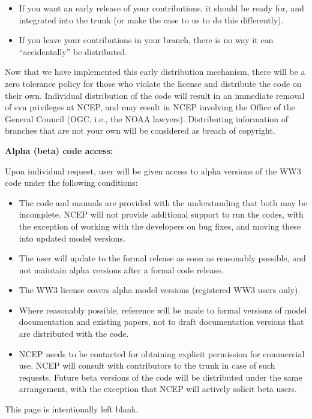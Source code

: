 \documentclass[12pt]{article}
\newcommand{\pb}{\strut \vfill \pagebreak}
\newcommand{\bpage}{\vfill \pagebreak \strut

\vspace{2.5in} \centerline{This page is intentionally left blank.}}
\newcommand{\bpagea}{\strut

\vspace{2.5in} \centerline{This page is intentionally left blank.}}
\begin{document}
\begin{itemize}
\item If you want an early release of your contributions, it should be ready
  for, and integrated into the trunk (or make the case to us to do this
  differently).
\item If you leave your contributions in your branch, there is no
  way it can ``accidentally'' be distributed.  
\end{itemize}

\noindent
Now that we have implemented this early distribution mechanism, there will be
a zero tolerance policy for those who violate the license and distribute the
code on their own. Individual distribution of the code will result in an
immediate removal of svn privileges at NCEP, and may result in NCEP involving
the Office of the General Council (OGC, i.e., the NOAA lawyers). Distributing
information of branches that are not your own will be considered as breach of
copyright.

\vspace{\baselineskip} \noindent
{\bf Alpha (beta) code access: }

\vspace{\baselineskip} \noindent 
Upon individual request, user will be given access to alpha versions of the
WW3 code under the following conditions: 

\begin{itemize}
\item The code and manuals are provided with the understanding that both may
  be incomplete. NCEP will not provide additional support to run the codes,
  with the exception of working with the developers on bug fixes, and moving
  these into updated model versions.
\item The user will update to the formal release as soon as reasonably
  possible, and not maintain alpha versions after a formal code release.
\item The WW3 license covers alpha model versions (registered WW3 users only).
\item Where reasonably possible, reference will be made to formal versions of
  model documentation and existing papers, not to draft documentation versions
  that are distributed with the code.
\item NCEP needs to be contacted for obtaining explicit permission for
  commercial use. NCEP will consult with contributors to the trunk in case of
  such requests.  Future beta versions of the code will be distributed under
  the same arrangement, with the exception that NCEP will actively solicit
  beta users.
\end{itemize}


\pb
{}
\setcounter{footnote}{0}


%



\pb
\pagestyle{empty}
\bpagea
\end{document}
